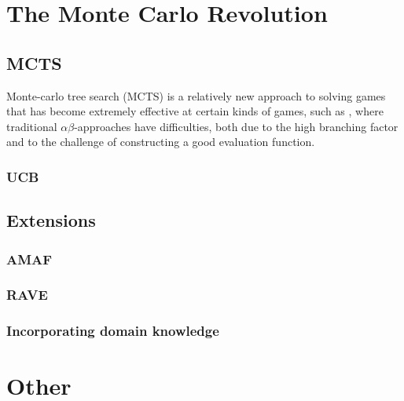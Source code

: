 \documentclass[10pt,dvipdfmx]{report}
\newcommand{\ab}{{$\alpha\beta$}}
\newcommand{\g}[1]{{\sc{#1}}\index{{\sc{#1}}}}
\begin{document}
\part{The Monte Carlo Revolution}

\chapter{MCTS}
\label{chap-mcts}

Monte-carlo tree search (MCTS) is a relatively new approach to solving
games that has become extremely effective at certain kinds of games, such
as \g{go}, where traditional \ab-approaches have difficulties, both
due to the high branching factor and to the challenge of constructing a good
evaluation function.

\section{UCB}


\chapter{Extensions}
\label{chap-mcts-extensions}

\section{AMAF}

\section{RAVE}

\section{Incorporating domain knowledge}



\part{Other}
\end{document}
